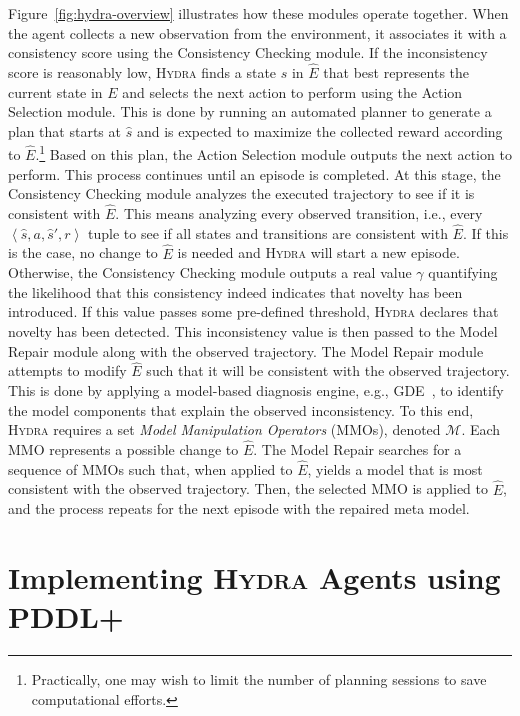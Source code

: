 \documentclass[letterpaper]{article} %
\newcommand{\tuple}[1]{\ensuremath{\left \langle #1 \right \rangle }} %
\newcommand{\hydra}{\textsc{Hydra}\xspace} %
\begin{document}
Figure~\ref{fig:hydra-overview} illustrates how these modules operate together. 
When the agent collects a new observation from the environment, it associates it with a consistency score using the Consistency Checking module. 
If the inconsistency score is reasonably low, \hydra finds a state $\hat{s}$ in $\hat{E}$ that best represents the current state in $E$ and selects the next action to perform using the Action Selection module. 
This is done by running an automated planner to generate a plan that starts at $\hat{s}$ and is expected to  maximize the collected reward according to $\hat{E}$.\footnote{Practically, one may wish to limit the number of planning sessions to save computational efforts.} 
Based on this plan, the Action Selection module outputs the next action to perform. 
This process continues until an episode is completed. 
At this stage, the Consistency Checking module analyzes the executed trajectory to see if it is consistent with $\hat{E}$. 
This means analyzing every observed transition, i.e., every $\tuple{\hat{s}, a, \hat{s}',r}$ tuple to see if all states and transitions are consistent with $\hat{E}$. 
If this is the case, no change to $\hat{E}$ is needed and \hydra will start a new episode. 
Otherwise, the Consistency Checking module outputs a real value $\gamma$ quantifying the likelihood that this consistency indeed indicates that novelty has been introduced. 
If this value passes some pre-defined threshold, \hydra declares that novelty has been detected. 
This inconsistency value is then passed to the Model Repair module along with the observed trajectory. 
The Model Repair module attempts to modify $\hat{E}$ such that it will be consistent with the observed trajectory. 
This is done by applying a model-based diagnosis engine, e.g., GDE~\cite{dekleer1987diagnosing}, to identify the model components that explain the observed inconsistency. 
To this end, \hydra requires a set \emph{Model Manipulation Operators} (MMOs), denoted $\mathcal{M}$. 
Each MMO represents a possible change to $\hat{E}$. 
The Model Repair searches for a sequence of MMOs such that, when applied to $\hat{E}$, yields a model that is most consistent with the observed trajectory.  
Then, the selected MMO is applied to $\hat{E}$, and the process repeats for the next episode with the repaired meta model. 


\section{Implementing \hydra Agents using PDDL+}
\end{document}
